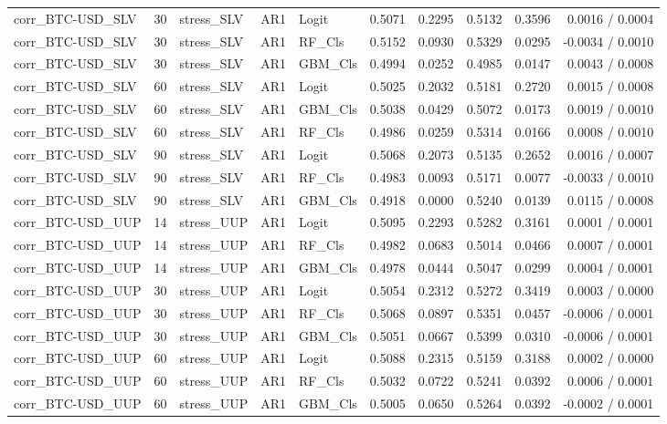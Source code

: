 \begin{table}[H]
\begin{tabular}{lllllrrrrr}
corr_BTC-USD_SLV & 30 & stress_SLV & AR1 & Logit & 0.5071 & 0.2295 & 0.5132 & 0.3596 & 0.0016 / 0.0004 \\
corr_BTC-USD_SLV & 30 & stress_SLV & AR1 & RF_Cls & 0.5152 & 0.0930 & 0.5329 & 0.0295 & -0.0034 / 0.0010 \\
corr_BTC-USD_SLV & 30 & stress_SLV & AR1 & GBM_Cls & 0.4994 & 0.0252 & 0.4985 & 0.0147 & 0.0043 / 0.0008 \\
corr_BTC-USD_SLV & 60 & stress_SLV & AR1 & Logit & 0.5025 & 0.2032 & 0.5181 & 0.2720 & 0.0015 / 0.0008 \\
corr_BTC-USD_SLV & 60 & stress_SLV & AR1 & GBM_Cls & 0.5038 & 0.0429 & 0.5072 & 0.0173 & 0.0019 / 0.0010 \\
corr_BTC-USD_SLV & 60 & stress_SLV & AR1 & RF_Cls & 0.4986 & 0.0259 & 0.5314 & 0.0166 & 0.0008 / 0.0010 \\
corr_BTC-USD_SLV & 90 & stress_SLV & AR1 & Logit & 0.5068 & 0.2073 & 0.5135 & 0.2652 & 0.0016 / 0.0007 \\
corr_BTC-USD_SLV & 90 & stress_SLV & AR1 & RF_Cls & 0.4983 & 0.0093 & 0.5171 & 0.0077 & -0.0033 / 0.0010 \\
corr_BTC-USD_SLV & 90 & stress_SLV & AR1 & GBM_Cls & 0.4918 & 0.0000 & 0.5240 & 0.0139 & 0.0115 / 0.0008 \\
corr_BTC-USD_UUP & 14 & stress_UUP & AR1 & Logit & 0.5095 & 0.2293 & 0.5282 & 0.3161 & 0.0001 / 0.0001 \\
corr_BTC-USD_UUP & 14 & stress_UUP & AR1 & RF_Cls & 0.4982 & 0.0683 & 0.5014 & 0.0466 & 0.0007 / 0.0001 \\
corr_BTC-USD_UUP & 14 & stress_UUP & AR1 & GBM_Cls & 0.4978 & 0.0444 & 0.5047 & 0.0299 & 0.0004 / 0.0001 \\
corr_BTC-USD_UUP & 30 & stress_UUP & AR1 & Logit & 0.5054 & 0.2312 & 0.5272 & 0.3419 & 0.0003 / 0.0000 \\
corr_BTC-USD_UUP & 30 & stress_UUP & AR1 & RF_Cls & 0.5068 & 0.0897 & 0.5351 & 0.0457 & -0.0006 / 0.0001 \\
corr_BTC-USD_UUP & 30 & stress_UUP & AR1 & GBM_Cls & 0.5051 & 0.0667 & 0.5399 & 0.0310 & -0.0006 / 0.0001 \\
corr_BTC-USD_UUP & 60 & stress_UUP & AR1 & Logit & 0.5088 & 0.2315 & 0.5159 & 0.3188 & 0.0002 / 0.0000 \\
corr_BTC-USD_UUP & 60 & stress_UUP & AR1 & RF_Cls & 0.5032 & 0.0722 & 0.5241 & 0.0392 & 0.0006 / 0.0001 \\
corr_BTC-USD_UUP & 60 & stress_UUP & AR1 & GBM_Cls & 0.5005 & 0.0650 & 0.5264 & 0.0392 & -0.0002 / 0.0001 \\

\end{tabular}
\end{table}
